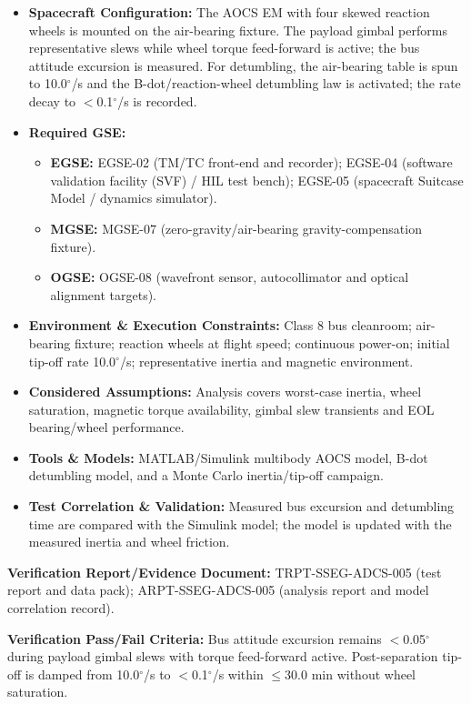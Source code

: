 \begin{itemize}
\item \textbf{Spacecraft Configuration:} The AOCS EM with four skewed reaction wheels is mounted on the air-bearing fixture. The payload gimbal performs representative slews while wheel torque feed-forward is active; the bus attitude excursion is measured. For detumbling, the air-bearing table is spun to 10.0$^\circ$/s and the B-dot/reaction-wheel detumbling law is activated; the rate decay to $<$0.1$^\circ$/s is recorded.
\item \textbf{Required GSE:}
\begin{itemize}
\item \textbf{EGSE:} EGSE-02 (TM/TC front-end and recorder); EGSE-04 (software validation facility (SVF) / HIL test bench); EGSE-05 (spacecraft Suitcase Model / dynamics simulator).
\item \textbf{MGSE:} MGSE-07 (zero-gravity/air-bearing gravity-compensation fixture).
\item \textbf{OGSE:} OGSE-08 (wavefront sensor, autocollimator and optical alignment targets).
\end{itemize}
\item \textbf{Environment \& Execution Constraints:} Class 8 bus cleanroom; air-bearing fixture; reaction wheels at flight speed; continuous power-on; initial tip-off rate 10.0$^\circ$/s; representative inertia and magnetic environment.
\item \textbf{Considered Assumptions:} Analysis covers worst-case inertia, wheel saturation, magnetic torque availability, gimbal slew transients and EOL bearing/wheel performance.
\item \textbf{Tools \& Models:} MATLAB/Simulink multibody AOCS model, B-dot detumbling model, and a Monte Carlo inertia/tip-off campaign.
\item \textbf{Test Correlation \& Validation:} Measured bus excursion and detumbling time are compared with the Simulink model; the model is updated with the measured inertia and wheel friction.
\end{itemize}
\par\textbf{Verification Report/Evidence Document:} TRPT-SSEG-ADCS-005 (test report and data pack); ARPT-SSEG-ADCS-005 (analysis report and model correlation record).
\par\textbf{Verification Pass/Fail Criteria:} Bus attitude excursion remains $<$0.05$^\circ$ during payload gimbal slews with torque feed-forward active. Post-separation tip-off is damped from 10.0$^\circ$/s to $<$0.1$^\circ$/s within $\le$30.0 min without wheel saturation.
\par\medskip
